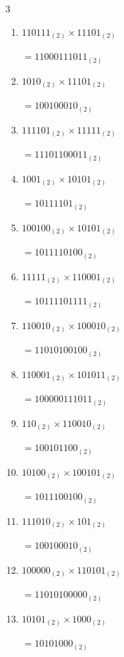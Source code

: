 \begin{multicols}{3}
\begin{enumerate}
  \item $110111_{(2)} \times 11101_{(2)}$

        $=11000111011_{(2)}$

  \item $1010_{(2)} \times 11101_{(2)}$

        $=100100010_{(2)}$

  \item $111101_{(2)} \times 11111_{(2)}$

        $=11101100011_{(2)}$

\columnbreak %

\resetques

  \item $1001_{(2)} \times 10101_{(2)}$

        $=10111101_{(2)}$

  \item $100100_{(2)} \times 10101_{(2)}$

        $=1011110100_{(2)}$

  \item $11111_{(2)} \times 110001_{(2)}$

        $=10111101111_{(2)}$

  \item $110010_{(2)} \times 100010_{(2)}$

        $=11010100100_{(2)}$

  \item $110001_{(2)} \times 101011_{(2)}$

        $=100000111011_{(2)}$

\columnbreak %

  \item $110_{(2)} \times 110010_{(2)}$

        $=100101100_{(2)}$

  \item $10100_{(2)} \times 100101_{(2)}$

        $=1011100100_{(2)}$

  \item $111010_{(2)} \times 101_{(2)}$

        $=100100010_{(2)}$

  \item $100000_{(2)} \times 110101_{(2)}$

        $=11010100000_{(2)}$

  \item $10101_{(2)} \times 1000_{(2)}$

        $=10101000_{(2)}$


\end{enumerate}
\end{multicols}
